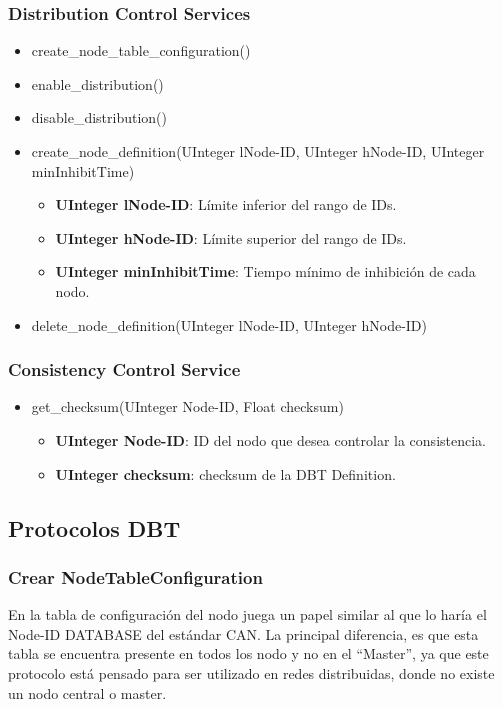 \subsubsection{Distribution Control Services}
\begin{itemize}
  \item create\_node\_table\_configuration()
  \item enable\_distribution()
  \item disable\_distribution()
  \item create\_node\_definition(UInteger lNode-ID, UInteger hNode-ID, UInteger minInhibitTime)
    \begin{itemize}
    \item \textbf{UInteger lNode-ID}: Límite inferior del rango de IDs.
    \item \textbf{UInteger hNode-ID}: Límite superior del rango de IDs.
    \item \textbf{UInteger minInhibitTime}: Tiempo mínimo de inhibición de cada
      nodo.
    \end{itemize}
  \item delete\_node\_definition(UInteger lNode-ID, UInteger hNode-ID)
\end{itemize}

\subsubsection{Consistency Control Service}

\begin{itemize}
\item get\_checksum(UInteger Node-ID, Float checksum)
  \begin{itemize}
      \item \textbf{UInteger Node-ID}: ID del nodo que desea controlar la
    consistencia.
      \item \textbf{UInteger checksum}: checksum de la DBT Definition.
  \end{itemize}
\end{itemize}


\subsection{Protocolos DBT}
\subsubsection{Crear NodeTableConfiguration}
En la tabla de configuración del nodo juega un papel similar al que lo haría el
Node-ID DATABASE del estándar CAN. La principal diferencia, es que esta tabla
se encuentra presente en todos los nodo y no en el ``Master'', ya que este
protocolo está pensado para ser utilizado en redes distribuidas, donde no
existe un nodo central o master.

